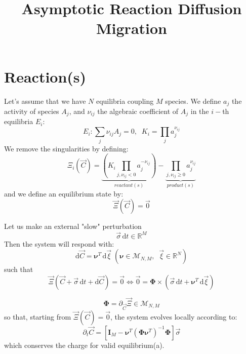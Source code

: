 \documentclass[aps,12pt]{revtex4}
\begin{document}
\title{Asymptotic Reaction Diffusion Migration}
\maketitle

\section{Reaction(s)}

Let's assume that we have $N$ equilibria coupling $M$ species.
We define $a_j$ the activity of species $A_j$, and $\nu_{ij}$ the algebraic
coefficient of $A_j$ in the $i-$th equilibria $E_i$:
\begin{equation}
	E_i : \sum_j \nu_{ij} A_j = 0, \;\;K_i = \prod_j a_j^{\nu_{ij}}
\end{equation}
We remove the singularities by defining:
\begin{equation}
	\Xi_i(\vec C) = \underbrace{(K_i \prod_{j,\nu_{ij}<0} a_j^{-\nu_{ij}})}_{reactant(s)} - \underbrace{\prod_{j,\nu_{ij}\geq0} a_j^{\nu_{ij}}}_{product(s)}
\end{equation}
and we define an equilibrium state by:
\begin{equation}
	\vec \Xi ( \vec C ) = \vec 0
\end{equation}

Let us make an external "slow" perturbation 
\begin{equation}
	\vec \sigma \, \mathrm{d} t \in \mathbb R ^M
\end{equation}
Then the system will respond with:
\begin{equation}
	\mathrm{d} \vec C = \bm{\nu}^T \, \mathrm{d}\vec \xi\; (\bm{\nu} \in \mathcal M_{N,M},\;\; \vec \xi \in \mathbb R ^N)
\end{equation}
such that
\begin{equation}
	\vec \Xi(\vec C + \vec \sigma \, \mathrm{d} t + \mathrm{d} \vec C ) = \vec 0 \iff \vec 0 = 
	\bm{\Phi} \times ( \vec \sigma \, \mathrm{d} t + \bm{\nu}^T \, \mathrm{d}\vec \xi)
\end{equation}

\begin{equation}
	\bm{\Phi} = \partial_{\vec C} \vec \Xi \in \mathcal M_{N,M}
\end{equation}
so that, starting from $\vec \Xi ( \vec C ) = \vec 0$, the system evolves locally according to:
\begin{equation}
\boxed{
	\partial_t \vec C = \left[\bm{I}_M - \bm{\nu}^T (\bm \Phi \bm{\nu}^T) ^{-1} \bm \Phi \right] \vec \sigma
	}
\end{equation}
which conserves the charge for valid equilibrium(a).
\end{document}
